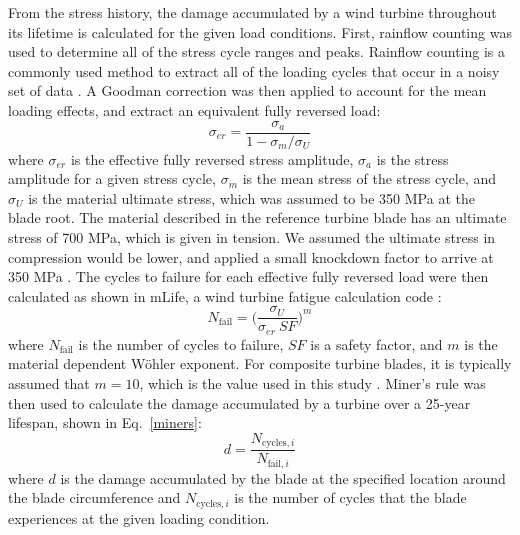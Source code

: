 \documentclass[11pt,letterpaper]{article}
\begin{document}
From the stress history, the damage accumulated by a wind turbine throughout its lifetime is calculated for the given load conditions.
First, rainflow counting was used to determine all of the stress cycle ranges and peaks. Rainflow counting is a commonly used method to extract all of the loading cycles that occur in a noisy set of data \cite{matsuishi1968fatigue}.
A Goodman correction was then applied to account for the mean loading effects, and extract an equivalent fully reversed load:
\begin{equation}
    \sigma_{er} = \frac{\sigma_a}{1-\sigma_m/\sigma_U}
    \label{goodman}
\end{equation}
\noindent where $\sigma_{er}$ is the effective fully reversed stress amplitude, $\sigma_{a}$ is the stress amplitude for a given stress cycle, $\sigma_{m}$ is the mean stress of the stress cycle, and $\sigma_{U}$ is the material ultimate stress, which was assumed to be 350 MPa at the blade root. The material described in the reference turbine blade has an ultimate stress of 700 MPa, which is given in tension. We assumed the ultimate stress in compression would be lower, and applied a small knockdown factor to arrive at 350 MPa \cite{resor2013definition}.
% 
The cycles to failure for each effective fully reversed load were then calculated as shown in mLife, a wind turbine fatigue calculation code
\cite{hayman2012mlife}:
% 
\begin{equation}
    N_{\text{fail}} = \Big(\frac{\sigma_U}{\sigma_{er}~SF}\Big)^m
    \label{cycles}
\end{equation}
%
\noindent where $N_{\text{fail}}$ is the number of cycles to failure, $SF$ is a safety factor, and $m$ is the material dependent W\"{o}hler exponent. For composite turbine blades, it is typically assumed that $m=10$, which is the value used in this study \cite{Ingersoll2018}. 
Miner's rule was then used to calculate the damage accumulated by a turbine over a 25-year lifespan, shown in Eq.~\ref{miners}:
\begin{equation}
    d = \frac{N_{\text{cycles},i}}{N_{\text{fail},i}}
    \label{miners}
\end{equation}
\noindent where $d$ is the damage accumulated by the blade at the specified location around the blade circumference and $N_{\text{cycles},i}$ is the number of cycles that the blade experiences at the given loading condition. 
\end{document}
